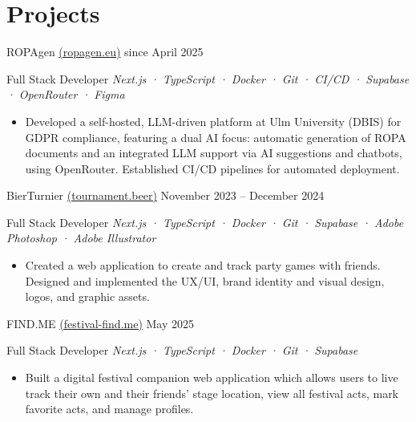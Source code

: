\section*{Projects}

{\companyfont ROPAgen \href{https://ropagen.eu}{{(ropagen.eu)}}} 
\href{https://github.com/ganglem/ROPAgen}{{\faGithub}} 
\href{https://ropagen.eu}{{\faGlobe}} 
\hfill \textcolor{shadeGray}{since April 2025}

{\rolefont Full Stack Developer} \hfill
\textit{\textcolor{shadeGray}{Next.js · TypeScript · Docker · Git · CI/CD · Supabase · OpenRouter · Figma}}

\begin{itemize}
    \item Developed a self-hosted, LLM-driven platform at Ulm University (DBIS) for GDPR compliance, featuring a dual AI focus: automatic generation of ROPA documents and an integrated LLM support via AI suggestions and chatbots, using OpenRouter. Established CI/CD pipelines for automated deployment.
\end{itemize}

\subsectionspacing

{\companyfont BierTurnier \href{https://tournament.beer}{{(tournament.beer)}}}
\href{https://github.com/MarkusThielker/bier-turnier}{{\faGithub}}
\href{https://tournament.beer}{{\faGlobe}}
\hfill \textcolor{shadeGray}{November 2023 – December 2024}

{\rolefont Full Stack Developer} \hfill
\textit{\textcolor{shadeGray}{Next.js · TypeScript · Docker · Git ·  Supabase · Adobe Photoshop · Adobe Illustrator}}

\begin{itemize}
    \item Created a web application to create and track party games with friends. Designed and implemented the UX/UI, brand identity and visual design, logos, and graphic assets.
\end{itemize}

\subsectionspacing

{\companyfont FIND.ME \href{https://festival-find.me}{{(festival-find.me)}}}
\href{https://github.com/ganglem/findme}{{\faGithub}}
\href{https://festival-find.me}{{\faGlobe}}
\hfill \textcolor{shadeGray}{May 2025}

{\rolefont Full Stack Developer} \hfill
\textit{\textcolor{shadeGray}{Next.js · TypeScript · Docker · Git · Supabase}}

\begin{itemize}
    \item Built a digital festival companion web application which allows users to live track their own and their friends' stage location, view all festival acts, mark favorite acts, and manage profiles.
\end{itemize}
